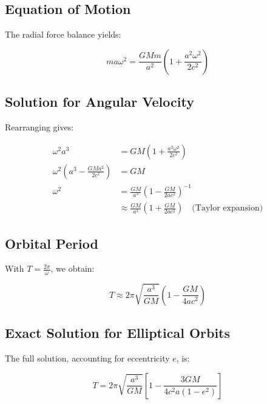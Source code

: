 \subsection*{Equation of Motion}
The radial force balance yields:

\begin{equation}
m a \omega^2 = \frac{GMm}{a^2}\left(1 + \frac{a^2 \omega^2}{2c^2}\right)
\end{equation}

\subsection*{Solution for Angular Velocity}
Rearranging gives:

\begin{align}
\omega^2 a^3 &= GM \left(1 + \frac{a^2 \omega^2}{2c^2}\right) \\
\omega^2 \left(a^3 - \frac{GM a^2}{2c^2}\right) &= GM \\
\omega^2 &= \frac{GM}{a^3} \left(1 - \frac{GM}{2a c^2}\right)^{-1} \\
&\approx \frac{GM}{a^3} \left(1 + \frac{GM}{2a c^2}\right) \quad \text{(Taylor expansion)}
\end{align}

\subsection*{Orbital Period}
With \( T = \frac{2\pi}{\omega} \), we obtain:

\begin{equation}
T \approx 2\pi \sqrt{\frac{a^3}{GM}} \left(1 - \frac{GM}{4a c^2}\right)
\end{equation}

\subsection*{Exact Solution for Elliptical Orbits}
The full solution, accounting for eccentricity \( e \), is:

\begin{equation}
\boxed{T = 2\pi \sqrt{\frac{a^3}{GM}} \left[1 - \frac{3GM}{4c^2 a(1-e^2)}\right]}
\end{equation}

